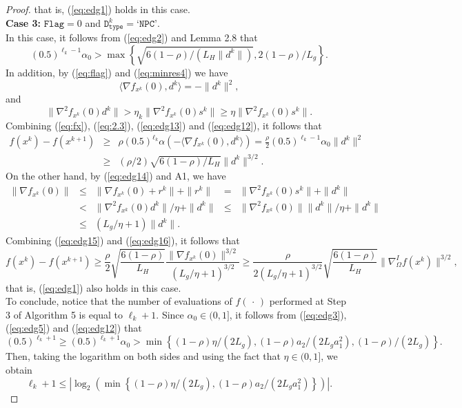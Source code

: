 \documentclass[11pt]{article}
\begin{document}
\begin{proof}
that is, (\ref{eq:edg1}) holds in this case.
\\[0.2cm]
\noindent\textbf{Case 3:} $\texttt{Flag}=0$ and $\texttt{D}_{\texttt{type}}^{k}=\texttt{`NPC'}$.
\\[0.2cm]
\noindent In this case, it follows from (\ref{eq:edg2}) and Lemma 2.8 that
\begin{equation}
(0.5)^{\ell_{k}-1}\alpha_{0}>\max\left\{\sqrt{6(1-\rho)/(L_{H}\|d^{k}\|)},2(1-\rho)/L_{g}\right\}.
\label{eq:edg12}
\end{equation}
In addition, by (\ref{eq:flag}) and (\ref{eq:minres4}) we have
\begin{equation}
    \langle\nabla f_{x^{k}}(0),d^{k}\rangle=-\|d^{k}\|^{2},
    \label{eq:edg13}
\end{equation}
and
\begin{equation}
\|\nabla^{2}f_{x^{k}}(0)d^{k}\|>\eta_{k}\|\nabla^{2}f_{x^{k}}(0)s^{k}\|\geq \eta\|\nabla^{2}f_{x^{k}}(0)s^{k}\| .
    \label{eq:edg14}
\end{equation}
Combining (\ref{eq:fx}), (\ref{eq:2.3}), (\ref{eq:edg13}) and (\ref{eq:edg12}), it follows that
\small
\begin{eqnarray}
f(x^{k})-f(x^{k+1})&\geq& 
\rho (0.5)^{\ell_{k}}\alpha\left(-\langle\nabla f_{x^{k}}(0),d^{k}\rangle\right)=\frac{\rho}{2}(0.5)^{\ell_{k}-1}\alpha_{0}\|d^{k}\|^{2}\nonumber\\
&\geq &(\rho/2)\sqrt{6(1-\rho)/L_{H}}\|d^{k}\|^{3/2}.
\label{eq:edg15}
\end{eqnarray}
\normalsize
On the other hand, by (\ref{eq:edg14}) and A1, we have
\small
\begin{equation} \label{eq:edg16}
\begin{array}{lclcl}
\|\nabla f_{x^{k}}(0)\| & \leq & \|\nabla f_{x^{k}}(0)+r^{k}\|+\|r^{k}\| & = & \|\nabla^{2} f_{x^{k}}(0)s^{k}\|+\|d^{k}\| \\[2mm]
& < & \|\nabla^{2} f_{x^{k}}(0)d^{k}\| / \eta+\|d^{k}\| & \leq & \|\nabla^{2}f_{x^{k}}(0)\|\|d^{k}\| / \eta +\|d^{k}\| \\[2mm]
& \leq & (L_{g}/\eta+1) \|d^{k}\|. & & 
\end{array}
\end{equation}
\normalsize
Combining (\ref{eq:edg15}) and (\ref{eq:edg16}), it follows that
\small
\[
f(x^{k})-f(x^{k+1}) 
\geq 
\frac{\rho}{2}\sqrt{\frac{6(1-\rho)}{L_{H}}}\frac{\|\nabla f_{x^{k}}(0)\|^{3/2}}{(L_{g}/\eta+1)^{3/2}}
\geq \frac{\rho}{2(L_{g}/\eta+1)^{3/2}}\sqrt{\frac{6(1-\rho)}{L_{H}}}\|\nabla_{\Omega}^{I}f(x^{k})\|^{3/2},
\]
\normalsize
that is, (\ref{eq:edg1}) also holds in this case.
\\[0.2cm]
To conclude, notice that the number of evaluations of $f(\,\cdot\,)$ performed at Step 3 of Algorithm 5 is equal to $\ell_{k}+1$. Since $\alpha_{0}\in (0,1]$, it follows from (\ref{eq:edg3}), (\ref{eq:edg5}) and (\ref{eq:edg12}) that
\[
(0.5)^{\ell_{k}+1}\geq (0.5)^{\ell_{k}+1}\alpha_{0}>\min\left\{(1-\rho)\eta/(2L_{g}), (1-\rho)a_{2}/(2L_{g}a_{1}^{2}),(1-\rho)/(2L_{g})\right\}.
\]
Then, taking the logarithm on both sides and using the fact that $\eta\in (0,1]$, we obtain
\[
\ell_{k}+1\leq\left|\log_{2}\left(\min\left\{(1-\rho)\eta/(2L_{g}),(1-\rho)a_{2}/(2L_{g}a_{1}^{2})\right\}\right)\right|.
\]
\end{proof}
\end{document}

